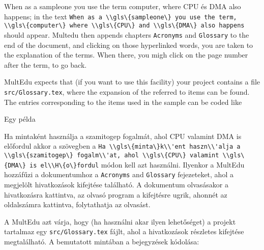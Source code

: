 {

When as a \gls{sampleone} you use the term \gls{computer},
where \gls{CPU} és \gls{DMA} also happens;
in the text \lstinline|When as a \\gls\{sampleone\} you use the term, \\gls\{computer\} where \\gls\{CPU\} and \\gls\{DMA\} also happens| should appear. \gls{Multedu} then appends chapters \lstinline|Acronyms| and \lstinline|Glossary| to the end of the document, and clicking on those hyperlinked words, you are taken
to the explanation of the terms. When there, you migh click on the page number after the term, to go back.

\gls{MultEdu} expects that (if you want to use this facility) your project
contains a file \lstinline|src/Glossary.tex|, where the expansion
of the referred to items can be found. The entries corresponding 
to the items used in the sample can be coded like
}
{Egy példa}
{

Ha \gls{minta}ként használja a \gls{szamitogep} fogalmát,
ahol \gls{CPU} valamint \gls{DMA} is előfordul
akkor a szövegben a \lstinline|Ha \\gls\{minta\}k\\'ent haszn\\'alja a \\gls\{szamitogep\} fogalm\\'at,
ahol \\gls\{CPU\} valamint \\gls\{DMA\} is el\\H\{o\}fordul|
módon kell azt használni.
Ilyenkor a \gls{MultEdu} hozzáfűzi a dokumentumhoz a \lstinline|Acronyms| and \lstinline|Glossary| fejezeteket, ahol a megjelölt hivatkozások kifejtése 
található. A dokumentum olvasásakor a hivatkozásra kattintva, az olvasó 
program a kifejtésre ugrik, ahonnét az oldalszámra kattintva, folytathatja
az olvasást.

A \gls{MultEdu} azt várja, hogy (ha használni akar ilyen lehetőséget) a projekt
tartalmaz egy \lstinline|src/Glossary.tex| fájlt,
ahol a hivatkozások részletes kifejtése megtalálható.
A bemutatott mintában a bejegyzések kódolása:

}




